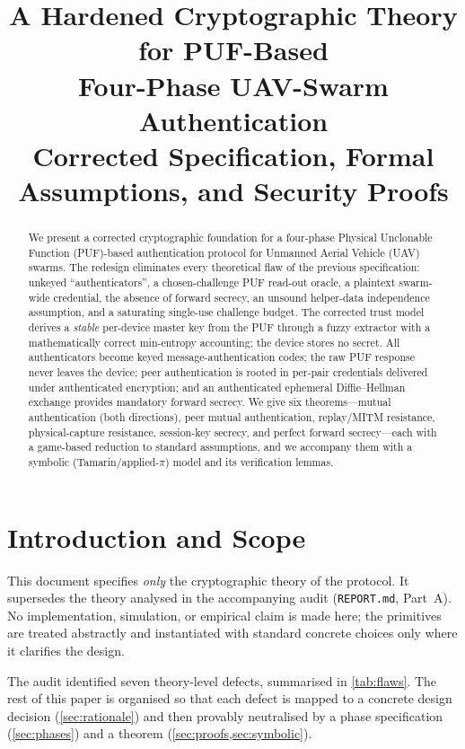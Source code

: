 \documentclass[11pt]{article}
\title{\textbf{A Hardened Cryptographic Theory for PUF-Based\\
Four-Phase UAV-Swarm Authentication}\\[4pt]
\large Corrected Specification, Formal Assumptions, and Security Proofs}
\author{}
\date{}
\theoremstyle{plain}
\theoremstyle{definition}
\begin{document}
\maketitle

\begin{abstract}
We present a corrected cryptographic foundation for a four-phase Physical
Unclonable Function (PUF)-based authentication protocol for Unmanned Aerial
Vehicle (UAV) swarms. The redesign eliminates every theoretical flaw of the
previous specification: unkeyed ``authenticators'', a chosen-challenge PUF
read-out oracle, a plaintext swarm-wide credential, the absence of forward
secrecy, an unsound helper-data independence assumption, and a saturating
single-use challenge budget. The corrected trust model derives a
\emph{stable} per-device master key from the PUF through a fuzzy extractor
with a mathematically correct min-entropy accounting; the device stores no
secret. All authenticators become keyed message-authentication codes; the
raw PUF response never leaves the device; peer authentication is rooted in
per-pair credentials delivered under authenticated encryption; and an
authenticated ephemeral Diffie--Hellman exchange provides mandatory forward
secrecy. We give six theorems---mutual authentication (both directions),
peer mutual authentication, replay/MITM resistance, physical-capture
resistance, session-key secrecy, and perfect forward secrecy---each with a
game-based reduction to standard assumptions, and we accompany them with a
symbolic (Tamarin/applied-$\pi$) model and its verification lemmas.
\end{abstract}

\tableofcontents

\section{Introduction and Scope}
This document specifies \emph{only} the cryptographic theory of the
protocol. It supersedes the theory analysed in the accompanying audit
(\texttt{REPORT.md}, Part~A). No implementation, simulation, or empirical
claim is made here; the primitives are treated abstractly and instantiated
with standard concrete choices only where it clarifies the design.

The audit identified seven theory-level defects, summarised in
\cref{tab:flaws}. The rest of this paper is organised so that each defect is
mapped to a concrete design decision (\cref{sec:rationale}) and then
provably neutralised by a phase specification (\cref{sec:phases}) and a
theorem (\cref{sec:proofs,sec:symbolic}).
\end{document}
